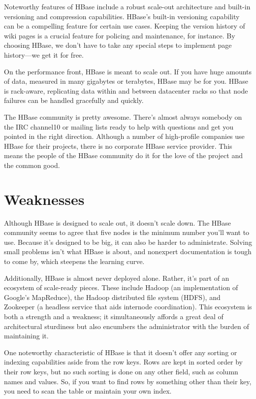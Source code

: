 Noteworthy features of HBase include a robust scale-out architecture and built-in versioning and compression capabilities. HBase's built-in versioning capability can be a compelling feature for certain use cases. Keeping the version history of wiki pages is a crucial feature for policing and maintenance, for instance. By choosing HBase, we don’t have to take any special steps to implement page history—we get it for free.

On the performance front, HBase is meant to scale out. If you have huge amounts of data, measured in many gigabytes or terabytes, HBase may be for you. HBase is rack-aware, replicating data within and between datacenter racks so that node failures can be handled gracefully and quickly.

The HBase community is pretty awesome. There's almost always somebody on the IRC channel10 or mailing lists ready to help with questions and get you pointed in the right direction. Although a number of high-profile companies use HBase for their projects, there is no corporate HBase service provider. This means the people of the HBase community do it for the love of the project and the common good.\cite{seven_databases}

\section{Weaknesses}

Although HBase is designed to scale out, it doesn't scale down. The HBase community seems to agree that five nodes is the minimum number you'll want to use. Because it's designed to be big, it can also be harder to administrate. Solving small problems isn't what HBase is about, and nonexpert documentation is tough to come by, which steepens the learning curve.

Additionally, HBase is almost never deployed alone. Rather, it's part of an ecosystem of scale-ready pieces. These include Hadoop (an implementation of Google's MapReduce), the Hadoop distributed file system (HDFS), and Zookeeper (a headless service that aids internode coordination). This ecosystem is both a strength and a weakness; it simultaneously affords a great deal of architectural sturdiness but also encumbers the administrator with the burden of maintaining it.

One noteworthy characteristic of HBase is that it doesn't offer any sorting or indexing capabilities aside from the row keys. Rows are kept in sorted order by their row keys, but no such sorting is done on any other field, such as column names and values. So, if you want to find rows by something other than their key, you need to scan the table or maintain your own index.

